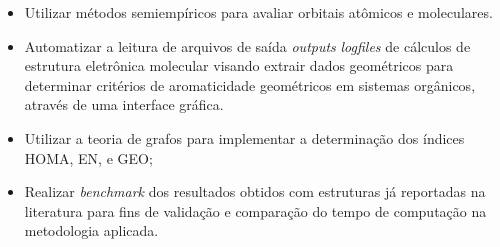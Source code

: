 \begin{itemize}
    
    \item Utilizar métodos semiempíricos para avaliar orbitais atômicos e moleculares.
    
    \item Automatizar a leitura de arquivos de saída \textit{outputs} \textit{logfiles} de cálculos de estrutura eletrônica molecular visando extrair dados geométricos para determinar critérios de aromaticidade geométricos em sistemas orgânicos, através de uma interface gráfica.

    \item Utilizar a teoria de grafos para implementar a determinação dos índices HOMA, EN, e GEO; 
    
    \item Realizar \textit{benchmark} dos resultados obtidos com estruturas já reportadas na literatura para fins de  validação e comparação do tempo de computação na metodologia aplicada.
\end{itemize}